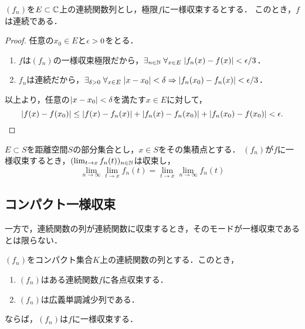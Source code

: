 \documentclass[uplatex, dvipdfmx]{jsreport}
\begin{document}
\begin{theorem}[一様収束は連続性を保つ]
    $(f_n)$を$E\subset\mathbb{C}$上の連続関数列とし，極限$f$に一様収束するとする．
    このとき，$f$は連続である．
\end{theorem}
\begin{proof}
    任意の$x_0\in E$と$\epsilon>0$をとる．
    \begin{enumerate}
        \item $f$は$(f_n)$の一様収束極限だから，$\exists_{n\in\mathbb{N}}\;\forall_{x\in E}\;\lvert f_n(x)-f(x)\rvert<\epsilon/3$．
        \item $f_n$は連続だから，$\exists_{\delta>0}\;\forall_{x\in E}\;\lvert x-x_0\rvert<\delta\Rightarrow\lvert f_n(x_0)-f_n(x)\rvert<\epsilon/3$．
    \end{enumerate}
    以上より，任意の$\lvert x-x_0\rvert<\delta$を満たす$x\in E$に対して，
    \[\lvert f(x)-f(x_0)\rvert\le\lvert f(x)-f_n(x)\rvert+\lvert f_n(x)-f_n(x_0)\rvert+\lvert f_n(x_0)-f(x_0)\rvert<\epsilon.\]
\end{proof}

\begin{theorem}
    $E\subset S$を距離空間$S$の部分集合とし，$x\in S$をその集積点とする．
    $(f_n)$が$f$に一様収束するとき，$(\lim_{t\to x}f_n(t))_{n\in\mathbb{N}}$は収束し，
    \[\lim_{n\to\infty}\lim_{t\to x}f_n(t)=\lim_{t\to x}\lim_{n\to\infty}f_n(t)\]
\end{theorem}

\subsection{コンパクト一様収束}

\begin{tcolorbox}[colframe=ForestGreen, colback=ForestGreen!10!white,breakable,colbacktitle=ForestGreen!40!white,coltitle=black,fonttitle=\bfseries\sffamily,
title=]
    一方で，連続関数の列が連続関数に収束するとき，そのモードが一様収束であるとは限らない．
\end{tcolorbox}

\begin{theorem}
    $(f_n)$をコンパクト集合$K$上の連続関数の列とする．このとき，
    \begin{enumerate}
        \item $(f_n)$はある連続関数$f$に各点収束する．
        \item $(f_n)$は広義単調減少列である．
    \end{enumerate}
    ならば，$(f_n)$は$f$に一様収束する．
\end{theorem}
\end{document}
